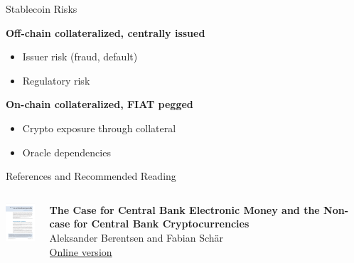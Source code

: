 \documentclass[handout]{beamer}
\begin{document}
\begin{frame}{Stablecoin Risks}

\textbf{Off-chain collateralized, centrally issued}
\begin{itemize}
	\item Issuer risk (fraud, default)
	\item Regulatory risk
\end{itemize}
\vspace{2em}


\textbf{On-chain collateralized, FIAT pegged}
\begin{itemize}
	\item Crypto exposure through collateral
	\item Oracle dependencies
\end{itemize}

\vspace{2em}

\end{frame}


\begin{frame}{References and Recommended Reading}
		\begin{columns}[T]
			\begin{column}{0.1\textwidth}
					\includegraphics[width = 1.7cm, frame]{../assets/images/berentsen_schaer}
			\end{column} %
			\begin{column}{0.8\textwidth}
				\textbf{The Case for Central Bank Electronic Money and the Non-case for Central Bank Cryptocurrencies} \\ 
				Aleksander Berentsen and Fabian Schär \\
				\link \href{https://https://research.stlouisfed.org/publications/review/2018/02/13/the-case-for-central-bank-electronic-money-and-the-non-case-for-central-bank-cryptocurrencies}{Online version}
			\end{column}
		\end{columns}
	
\end{frame}
\end{document}
